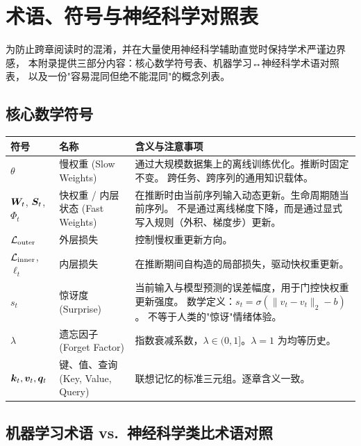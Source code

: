\chapter{术语、符号与神经科学对照表}
\label{ch:glossary}

为防止跨章阅读时的混淆，并在大量使用神经科学辅助直觉时保持学术严谨边界感，
本附录提供三部分内容：核心数学符号表、机器学习↔神经科学术语对照表，
以及一份"容易混同但绝不能混同"的概念列表。

\section{核心数学符号}

\begin{tabular}{p{2.5cm} p{4cm} p{7cm}}
\toprule
\textbf{符号} & \textbf{名称} & \textbf{含义与注意事项} \\
\midrule
$\theta$ & 慢权重 (Slow Weights)
  & 通过大规模数据集上的离线训练优化。推断时固定不变。
    跨任务、跨序列的通用知识载体。 \\
\midrule
$\boldsymbol{W}_t$, $\boldsymbol{S}_t$, $\Phi_t$ & 快权重 / 内层状态 (Fast Weights)
  & 在推断时由当前序列输入动态更新。生命周期随当前序列。
    不是通过离线梯度下降，而是通过显式写入规则（外积、梯度步）更新。 \\
\midrule
$\mathcal{L}_{\mathrm{outer}}$ & 外层损失
  & 控制慢权重更新方向。 \\
\midrule
$\mathcal{L}_{\mathrm{inner}}$, $\ell_t$ & 内层损失
  & 在推断期间自构造的局部损失，驱动快权重更新。 \\
\midrule
$s_t$ & 惊讶度 (Surprise)
  & 当前输入与模型预测的误差幅度，用于门控快权重更新强度。
    数学定义：$s_t = \sigma(\|\hat{v}_t - v_t\|_2 - b)$。
    不等于人类的"惊讶"情绪体验。 \\
\midrule
$\lambda$ & 遗忘因子 (Forget Factor)
  & 指数衰减系数，$\lambda \in (0,1]$。$\lambda=1$ 为均等历史。 \\
\midrule
$\boldsymbol{k}_t, \boldsymbol{v}_t, \boldsymbol{q}_t$ & 键、值、查询 (Key, Value, Query)
  & 联想记忆的标准三元组。逐章含义一致。 \\
\bottomrule
\end{tabular}

\section{机器学习术语 vs.\ 神经科学类比术语对照}

